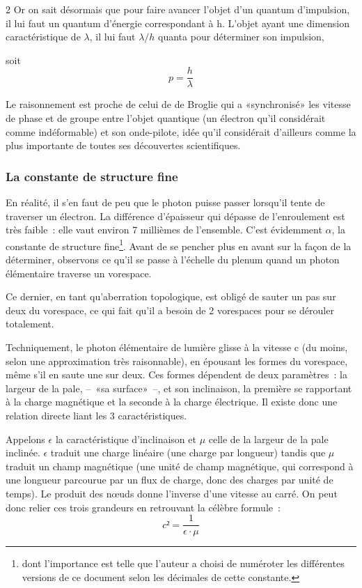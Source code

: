 \begin{multicols}{2}
Or on sait désormais que pour faire avancer l'objet d'un quantum d'impulsion,
 il lui faut un quantum d'énergie correspondant à h. L'objet
ayant une dimension caractéristique de $\lambda$, il lui faut $\lambda/h$
quanta pour déterminer son impulsion,

soit
\begin{equation*}
   p = \frac {h}{\lambda}
\end{equation*}

Le raisonnement est proche de celui de de Broglie qui a
«synchronisé» les vitesse de phase et de groupe entre l'objet
quantique (un électron qu'il considérait comme indéformable) et son
onde-pilote, idée qu'il considérait d'ailleurs comme la plus
importante de toutes ses découvertes scientifiques.\cite{debroglie1963etude}

\subsubsection{La constante de structure fine}

En réalité, il s'en faut de peu que le photon puisse passer lorsqu'il
tente de traverser un électron. La différence d'épaisseur qui dépasse
de l'enroulement est très faible : elle vaut environ 7 millièmes de
l'ensemble. C'est évidemment $\alpha$, la constante de structure fine\footnote{dont l'importance est telle que l'auteur a choisi de numéroter les différentes versions de ce document selon les décimales de cette constante.}.
Avant de se pencher plus en avant sur la façon de la déterminer,
observons ce qu'il se passe à l'échelle du plenum quand un photon
élémentaire traverse un vorespace.

Ce dernier, en tant qu'aberration topologique, est obligé de sauter un
pas sur deux du vorespace, ce qui fait qu'il a besoin de 2
vorespaces pour se dérouler totalement.

Techniquement, le photon élémentaire de lumière glisse à la vitesse c
(du moins, selon une approximation très raisonnable), en épousant les
formes du vorespace, même s'il en saute une sur deux. Ces formes
dépendent de deux paramètres : la largeur de la pale, --~«sa
surface»~--, et son inclinaison, la première se rapportant à la
charge magnétique et la seconde à la charge électrique. Il existe donc
une relation directe liant les 3 caractéristiques.

Appelons $\epsilon$ la caractéristique d'inclinaison et $\mu$ celle de la
largeur de la pale inclinée. $\epsilon$ traduit une charge linéaire (une
charge par longueur) tandis que $\mu$ traduit un champ magnétique (une
unité de champ magnétique, qui correspond à une longueur parcourue par
un flux de charge, donc des charges par unité de temps). Le produit
des nœuds donne l'inverse d'une vitesse au carré. On peut donc relier
ces trois grandeurs en retrouvant la célèbre formule :
\begin{equation*}
c² = \frac{1} {\epsilon \cdot \mu}
\end{equation*}


\end{multicols}
